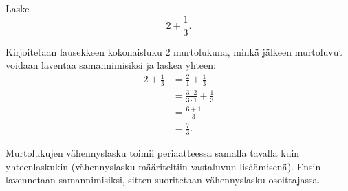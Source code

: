     \begin{esimerkki}
        Laske\[ 2 + \frac{1}{3}.\]
                \begin{esimratk}
        Kirjoitetaan lausekkeen kokonaisluku $2$ murtolukuna, minkä jälkeen murtoluvut voidaan laventaa samannimisiksi ja laskea yhteen:
        \begin{align*}
           2 + \frac{1}{3} &= \frac{2}{1} + \frac{1}{3}  \\ 
	   &= \frac{3 \cdot 2}{3 \cdot 1} + \frac{1}{3} \\ 
	   &= \frac{6+1}{3} \\ 
	   &= \frac{7}{3}.
        \end{align*}
                \end{esimratk}
    \end{esimerkki}
    
Murtolukujen vähennyslasku toimii periaatteessa samalla tavalla kuin yhteenlaskukin (vähennyslasku määriteltiin vastaluvun lisäämisenä). Ensin lavennetaan samannimisiksi, sitten suoritetaan vähennyslasku osoittajassa.



